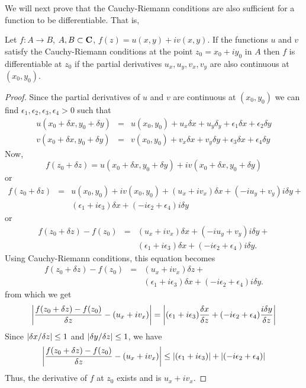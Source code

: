 We will next prove that the Cauchy-Riemann conditions are also sufficient for
a function to be differentiable. That is,
\begin{thm}\label{c2s2t2}
Let $f:A \rightarrow B$, $A, B \subset \mathbf{C}$, $f(z) = u(x, y) + iv(x, y)$. If
the functions $u$ and $v$ satisfy the Cauchy-Riemann conditions at the point
$z_0 = x_0 + iy_0$ in $A$ then $f$ is differentiable at $z_0$ if the partial
derivatives $u_x, u_y, v_x, v_y$ are also continuous at $(x_0, y_0)$.
\end{thm}
\begin{proof}
Since the partial derivatives of $u$ and $v$ are continuous at $(x_0, y_0)$
we can find $\epsilon_1, \epsilon_2, \epsilon_3, \epsilon_4 > 0$ such that
\begin{eqnarray*}
u(x_0 + \delta x, y_0 + \delta y) &=& u(x_0, y_0) + u_x\delta x + u_y\delta_y + 
  \epsilon_1 \delta x + \epsilon_2 \delta y \\
v(x_0 + \delta x, y_0 + \delta y) &=& v(x_0, y_0) + v_x\delta x + v_y\delta y + 
  \epsilon_3 \delta x + \epsilon_4 \delta y
\end{eqnarray*}
Now,
\[
f(z_0 + \delta z) = u(x_0 + \delta x, y_0 + \delta y) + 
                   iv(x_0 + \delta x, y_0 + \delta y)
\]
or
\begin{eqnarray*}
f(z_0+\delta z) &=& u(x_0,y_0) + iv(x_0,y_0) + (u_x+iv_x)\delta x + 
     (-iu_y+v_y)i\delta y + \\
& &  (\epsilon_1 + i\epsilon_3)\delta x + (-i\epsilon_2 + \epsilon_4)i\delta y
\end{eqnarray*}
or
\begin{eqnarray*}
f(z_0+\delta z)-f(z_0) &=& (u_x+iv_x)\delta x + (-iu_y+v_y)i\delta y + \\
& &  (\epsilon_1 + i\epsilon_3)\delta x + (-i\epsilon_2 + \epsilon_4)i\delta y.
\end{eqnarray*}
Using Cauchy-Riemann conditions, this equation becomes
\begin{eqnarray*}
f(z_0+\delta z)-f(z_0) &=& (u_x+iv_x)\delta z + \\ 
& &  (\epsilon_1 + i\epsilon_3)\delta x + (-i\epsilon_2 + \epsilon_4)i\delta y.
\end{eqnarray*}
from which we get
\[
\left\vert{\frac{f(z_0+\delta z)-f(z_0)}{\delta z}-(u_x+iv_x)}\right\vert = 
\left\vert{(\epsilon_1 + i\epsilon_3) \frac{\delta x}{\delta z} + 
(-i\epsilon_2 + \epsilon_4)\frac{i\delta y}{\delta z}}\right\vert
\]
Since $\left\vert{\delta x/\delta z}\right\vert \le 1$ and $\left\vert{\delta y/\delta z}\right\vert \le 1$, we
have
\[
\left\vert{\frac{f(z_0+\delta z)-f(z_0)}{\delta z}-(u_x+iv_x)}\right\vert \le
\left\vert{(\epsilon_1 + i\epsilon_3)}\right\vert + \left\vert{(-i\epsilon_2 + \epsilon_4)}\right\vert
\]
Thus, the derivative of $f$ at $z_0$ exists and is $u_x + iv_x$.
\end{proof}

